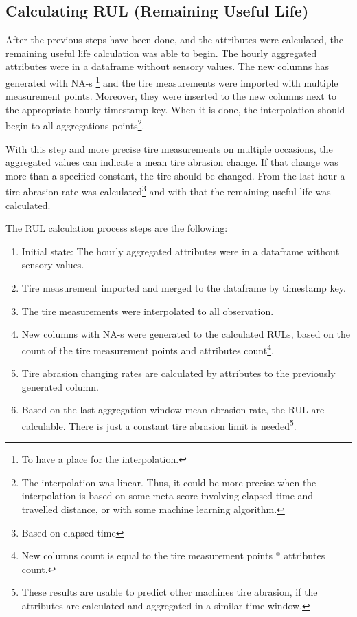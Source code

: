\subsection{Calculating RUL (Remaining Useful Life)}
	After the previous steps have been done, and the attributes were calculated, the remaining useful life calculation was able to begin.
	The hourly aggregated attributes were in a dataframe without sensory values. The new columns has generated with NA-s \footnote{To have a place for the interpolation.} and the tire measurements were imported with multiple measurement points. Moreover, they were inserted to the new columns next to the appropriate hourly timestamp key. When it is done, the interpolation should begin to all aggregations points\footnote{The interpolation was linear. Thus, it could be more precise when the interpolation is based on some meta score involving elapsed time and travelled distance, or with some machine learning algorithm.}.

	With this step and more precise tire measurements on multiple occasions, the aggregated values can indicate a mean tire abrasion change. If that change was more than a specified constant, the tire should be changed. From the last hour a tire abrasion rate was calculated\footnote{Based on elapsed time} and with that the remaining useful life was calculated.
	
	The RUL calculation process steps are the following:
	\begin{enumerate}
		\item{Initial state:} The hourly aggregated attributes were in a dataframe without sensory values. 
		\item{Tire measurement imported and merged to the dataframe by timestamp key.}
		\item{The tire measurements were interpolated to all observation.}
		\item{New columns with NA-s were generated to the calculated RULs}, based on the count of the tire measurement points and attributes count\footnote{New columns count is equal to the tire measurement points $*$ attributes count.}.
		\item{Tire abrasion changing rates are calculated by attributes to the previously generated column.}
		\item{Based on the last aggregation window mean abrasion rate, the RUL are calculable.} There is just a constant tire abrasion limit is needed\footnote{These results are usable to predict other machines tire abrasion, if the attributes are calculated and aggregated in a similar time window.}.
	\end{enumerate}
		
